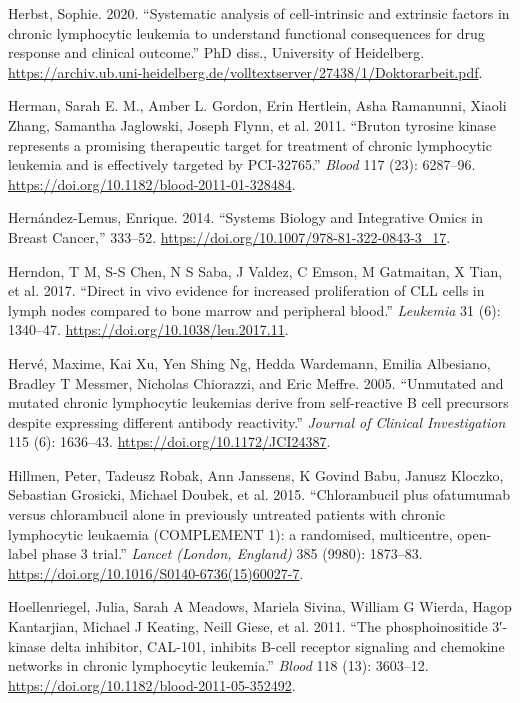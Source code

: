 \documentclass[11pt, a4paper, twosided]{book}
\newenvironment{CSLReferences}%
  {}%
  {\par}
\begin{document}
\begin{CSLReferences}{1}{0}
\leavevmode{}%
Herbst, Sophie. 2020. {``{Systematic analysis of cell-intrinsic and extrinsic factors in chronic lymphocytic leukemia to understand functional consequences for drug response and clinical outcome}.''} PhD diss., University of Heidelberg. \url{https://archiv.ub.uni-heidelberg.de/volltextserver/27438/1/Doktorarbeit.pdf}.

\leavevmode{}%
Herman, Sarah E. M., Amber L. Gordon, Erin Hertlein, Asha Ramanunni, Xiaoli Zhang, Samantha Jaglowski, Joseph Flynn, et al. 2011. {``{Bruton tyrosine kinase represents a promising therapeutic target for treatment of chronic lymphocytic leukemia and is effectively targeted by PCI-32765}.''} \emph{Blood} 117 (23): 6287--96. \url{https://doi.org/10.1182/blood-2011-01-328484}.

\leavevmode{}%
Hernández-Lemus, Enrique. 2014. {``{Systems Biology and Integrative Omics in Breast Cancer},''} 333--52. \url{https://doi.org/10.1007/978-81-322-0843-3_17}.

\leavevmode{}%
Herndon, T M, S-S Chen, N S Saba, J Valdez, C Emson, M Gatmaitan, X Tian, et al. 2017. {``{Direct in vivo evidence for increased proliferation of CLL cells in lymph nodes compared to bone marrow and peripheral blood}.''} \emph{Leukemia} 31 (6): 1340--47. \url{https://doi.org/10.1038/leu.2017.11}.

\leavevmode{}%
Hervé, Maxime, Kai Xu, Yen Shing Ng, Hedda Wardemann, Emilia Albesiano, Bradley T Messmer, Nicholas Chiorazzi, and Eric Meffre. 2005. {``{Unmutated and mutated chronic lymphocytic leukemias derive from self-reactive B cell precursors despite expressing different antibody reactivity}.''} \emph{Journal of Clinical Investigation} 115 (6): 1636--43. \url{https://doi.org/10.1172/JCI24387}.

\leavevmode{}%
Hillmen, Peter, Tadeusz Robak, Ann Janssens, K Govind Babu, Janusz Kloczko, Sebastian Grosicki, Michael Doubek, et al. 2015. {``{Chlorambucil plus ofatumumab versus chlorambucil alone in previously untreated patients with chronic lymphocytic leukaemia (COMPLEMENT 1): a randomised, multicentre, open-label phase 3 trial.}''} \emph{Lancet (London, England)} 385 (9980): 1873--83. \url{https://doi.org/10.1016/S0140-6736(15)60027-7}.

\leavevmode{}%
Hoellenriegel, Julia, Sarah A Meadows, Mariela Sivina, William G Wierda, Hagop Kantarjian, Michael J Keating, Neill Giese, et al. 2011. {``{The phosphoinositide 3′-kinase delta inhibitor, CAL-101, inhibits B-cell receptor signaling and chemokine networks in chronic lymphocytic leukemia}.''} \emph{Blood} 118 (13): 3603--12. \url{https://doi.org/10.1182/blood-2011-05-352492}.


\end{CSLReferences}
\end{document}
